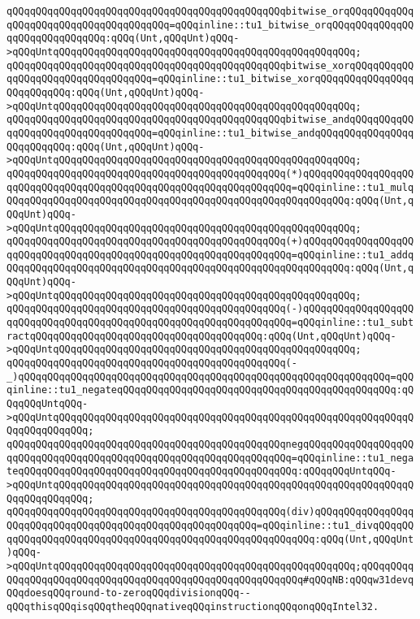 \verb|qQQqqQQqqQQqqQQqqQQqqQQqqQQqqQQqqQQqqQQqqQQqqQQqbitwise_orqQQqqQQqqQQqqQQqqQQqqQQqqQQqqQQqqQQqqQQq=qQQqinline::tu1_bitwise_orqQQqqQQqqQQqqQQqqQQqqQQqqQQqqQQq:qQQq(Unt,qQQqUnt)qQQq->qQQqUntqQQqqQQqqQQqqQQqqQQqqQQqqQQqqQQqqQQqqQQqqQQqqQQqqQQq;|\newline
\verb|qQQqqQQqqQQqqQQqqQQqqQQqqQQqqQQqqQQqqQQqqQQqqQQqbitwise_xorqQQqqQQqqQQqqQQqqQQqqQQqqQQqqQQqqQQq=qQQqinline::tu1_bitwise_xorqQQqqQQqqQQqqQQqqQQqqQQqqQQq:qQQq(Unt,qQQqUnt)qQQq->qQQqUntqQQqqQQqqQQqqQQqqQQqqQQqqQQqqQQqqQQqqQQqqQQqqQQqqQQq;|\newline
\verb|qQQqqQQqqQQqqQQqqQQqqQQqqQQqqQQqqQQqqQQqqQQqqQQqbitwise_andqQQqqQQqqQQqqQQqqQQqqQQqqQQqqQQqqQQq=qQQqinline::tu1_bitwise_andqQQqqQQqqQQqqQQqqQQqqQQqqQQq:qQQq(Unt,qQQqUnt)qQQq->qQQqUntqQQqqQQqqQQqqQQqqQQqqQQqqQQqqQQqqQQqqQQqqQQqqQQqqQQq;|\newline
\verb|qQQqqQQqqQQqqQQqqQQqqQQqqQQqqQQqqQQqqQQqqQQqqQQq(*)qQQqqQQqqQQqqQQqqQQqqQQqqQQqqQQqqQQqqQQqqQQqqQQqqQQqqQQqqQQqqQQqqQQq=qQQqinline::tu1_mulqQQqqQQqqQQqqQQqqQQqqQQqqQQqqQQqqQQqqQQqqQQqqQQqqQQqqQQqqQQq:qQQq(Unt,qQQqUnt)qQQq->qQQqUntqQQqqQQqqQQqqQQqqQQqqQQqqQQqqQQqqQQqqQQqqQQqqQQqqQQq;|\newline
\verb|qQQqqQQqqQQqqQQqqQQqqQQqqQQqqQQqqQQqqQQqqQQqqQQq(+)qQQqqQQqqQQqqQQqqQQqqQQqqQQqqQQqqQQqqQQqqQQqqQQqqQQqqQQqqQQqqQQqqQQq=qQQqinline::tu1_addqQQqqQQqqQQqqQQqqQQqqQQqqQQqqQQqqQQqqQQqqQQqqQQqqQQqqQQqqQQq:qQQq(Unt,qQQqUnt)qQQq->qQQqUntqQQqqQQqqQQqqQQqqQQqqQQqqQQqqQQqqQQqqQQqqQQqqQQqqQQq;|\newline
\verb|qQQqqQQqqQQqqQQqqQQqqQQqqQQqqQQqqQQqqQQqqQQqqQQq(-)qQQqqQQqqQQqqQQqqQQqqQQqqQQqqQQqqQQqqQQqqQQqqQQqqQQqqQQqqQQqqQQqqQQq=qQQqinline::tu1_subtractqQQqqQQqqQQqqQQqqQQqqQQqqQQqqQQqqQQqqQQq:qQQq(Unt,qQQqUnt)qQQq->qQQqUntqQQqqQQqqQQqqQQqqQQqqQQqqQQqqQQqqQQqqQQqqQQqqQQqqQQq;|\newline
\verb|qQQqqQQqqQQqqQQqqQQqqQQqqQQqqQQqqQQqqQQqqQQqqQQq(-_)qQQqqQQqqQQqqQQqqQQqqQQqqQQqqQQqqQQqqQQqqQQqqQQqqQQqqQQqqQQqqQQq=qQQqinline::tu1_negateqQQqqQQqqQQqqQQqqQQqqQQqqQQqqQQqqQQqqQQqqQQqqQQq:qQQqqQQqUntqQQq->qQQqUntqQQqqQQqqQQqqQQqqQQqqQQqqQQqqQQqqQQqqQQqqQQqqQQqqQQqqQQqqQQqqQQqqQQqqQQqqQQq;|\newline
\verb|qQQqqQQqqQQqqQQqqQQqqQQqqQQqqQQqqQQqqQQqqQQqqQQqnegqQQqqQQqqQQqqQQqqQQqqQQqqQQqqQQqqQQqqQQqqQQqqQQqqQQqqQQqqQQqqQQqqQQq=qQQqinline::tu1_negateqQQqqQQqqQQqqQQqqQQqqQQqqQQqqQQqqQQqqQQqqQQqqQQq:qQQqqQQqUntqQQq->qQQqUntqQQqqQQqqQQqqQQqqQQqqQQqqQQqqQQqqQQqqQQqqQQqqQQqqQQqqQQqqQQqqQQqqQQqqQQqqQQq;|\newline
\verb|qQQqqQQqqQQqqQQqqQQqqQQqqQQqqQQqqQQqqQQqqQQqqQQq(div)qQQqqQQqqQQqqQQqqQQqqQQqqQQqqQQqqQQqqQQqqQQqqQQqqQQqqQQqqQQq=qQQqinline::tu1_divqQQqqQQqqQQqqQQqqQQqqQQqqQQqqQQqqQQqqQQqqQQqqQQqqQQqqQQqqQQq:qQQq(Unt,qQQqUnt)qQQq->qQQqUntqQQqqQQqqQQqqQQqqQQqqQQqqQQqqQQqqQQqqQQqqQQqqQQqqQQq;qQQqqQQqqQQqqQQqqQQqqQQqqQQqqQQqqQQqqQQqqQQqqQQqqQQqqQQqqQQq#qQQqNB:qQQqw31devqQQqdoesqQQqround-to-zeroqQQqdivisionqQQq--qQQqthisqQQqisqQQqtheqQQqnativeqQQqinstructionqQQqonqQQqIntel32.|\newline
